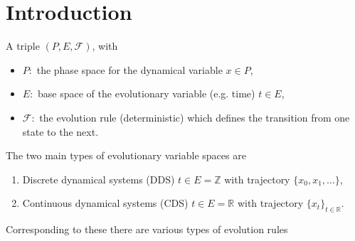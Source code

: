 \chapter{Introduction}
\begin{definition}
	A triple $(P,E, \mathcal{F})$, with
	\begin{itemize}
		\item $P :$ the phase space for the dynamical variable $x\in P$,
		\item  $E:$ base space of the evolutionary variable (e.g. time) $t \in E$,
		\item $\mathcal{F}: $ the evolution rule (deterministic) which defines the transition from one state to the next.
\end{itemize}
\end{definition}
The two main types of evolutionary variable spaces are
\begin{enumerate}
	\item Discrete dynamical systems (DDS) $t\in E=\mathbb{Z}$ with trajectory $\{x_0, x_1, \ldots\}$,
	\item Continuous dynamical systems (CDS) $t\in E=\mathbb{R}$ with trajectory $\{x_t\}_{t \in \mathbb{R}}$.
\end{enumerate}
Corresponding to these there are various types of evolution rules
